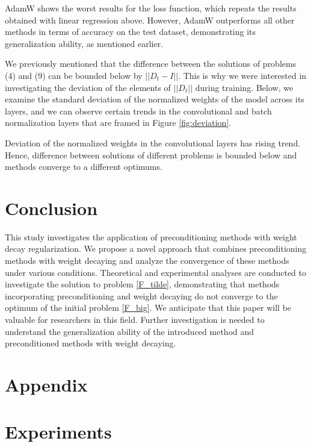 \documentclass[USenglish]{article}
\theoremstyle{dgthm}
\theoremstyle{dgdef}
\begin{document}
AdamW shows the worst results for the loss function, which repeats the results obtained with linear regression above. However, AdamW outperforms all other methods in terms of accuracy on the test dataset, demonstrating its generalization ability, as mentioned earlier.

We previously mentioned that the difference between the solutions of problems (4) and (9) can be bounded below by $||D_t - I||$.
This is why we were interested in investigating the deviation of the elements of $||D_t||$ during training.
Below, we examine the standard deviation of the normalized weights of the model across its layers, and we can observe certain trends in the convolutional and batch normalization layers that are framed in Figure \ref{fig:deviation}.

Deviation of the normalized weights in the convolutional layers has rising trend. Hence, difference
between solutions of different problems is bounded below and methods converge to a different optimums.

\section{Conclusion}

This study investigates the application of preconditioning methods with weight decay regularization.
We propose a novel approach that combines preconditioning methods with weight decaying and analyze the convergence of these methods under various conditions.
Theoretical and experimental analyses are conducted to investigate the solution to problem \eqref{F_tilde}, demonstrating that methods incorporating preconditioning and weight decaying do not converge to the optimum of the initial problem \eqref{F_big}.
We anticipate that this paper will be valuable for researchers in this field.
Further investigation is needed to understand the generalization ability of the introduced method and preconditioned methods with weight decaying.




\section{Appendix}

\appendix
\label{sec:appendix}

\section{Experiments}
\end{document}
